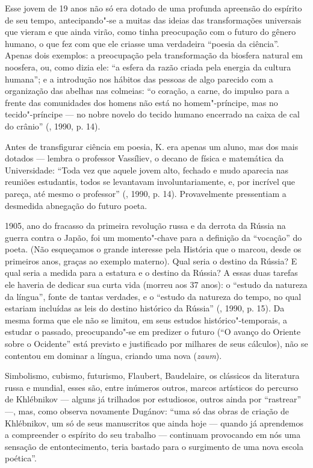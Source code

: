 Esse jovem de 19 anos não só era dotado de uma profunda apreensão do
espírito de seu tempo, antecipando"-se a muitas das ideias das
transformações universais que vieram e que ainda virão, como tinha
preocupação com o futuro do gênero humano, o que fez com que ele criasse
uma verdadeira ``poesia da ciência''. Apenas dois exemplos: a
preocupação pela transformação da biosfera natural em noosfera, ou, como
dizia ele: ``a esfera da razão criada pela energia da cultura humana'';
e a introdução nos hábitos das pessoas de algo parecido com a
organização das abelhas nas colmeias: ``o coração, a carne, do impulso
para a frente das comunidades dos homens não está no homem"-príncipe, mas
no tecido"-príncipe --- no nobre novelo do tecido humano encerrado na
caixa de cal do crânio'' (, 1990, p. 14).

Antes de transfigurar ciência em poesia, K.
era apenas um aluno, mas dos mais dotados --- lembra o professor Vassíliev, o
decano de física e matemática da Universidade: ``Toda vez que aquele
jovem alto, fechado e mudo aparecia nas reuniões estudantis, todos se
levantavam involuntariamente, e, por incrível que pareça, até mesmo o
professor'' (, 1990, p. 14). Provavelmente pressentiam a desmedida abnegação do futuro
poeta.

1905, ano do fracasso da primeira revolução
russa e da derrota da Rússia na guerra contra o Japão, foi um momento"-chave
para a definição da ``vocação'' do poeta. (Não esqueçamos o
grande interesse pela História que o marcou, desde os primeiros
anos, graças ao exemplo materno). Qual seria o destino da Rússia? E qual
seria a medida para a estatura e o destino da Rússia? A essas duas
tarefas ele haveria de dedicar sua curta vida (morreu aos
37 anos): o ``estudo da natureza da língua'', fonte de tantas verdades, e o
``estudo da natureza do tempo, no qual estariam incluídas as leis do
destino histórico da Rússia'' (, 1990, p. 15). Da mesma forma que ele não se limitou, em
seus estudos histórico"-temporais, a estudar o passado, preocupando"-se
em predizer o futuro (``O avanço do Oriente sobre o Ocidente'' está
previsto e justificado por milhares de seus cálculos), não se contentou em dominar a língua,
criando uma nova (\emph{zaum}).

Simbolismo, cubismo, futurismo, Flaubert, Baudelaire, os clássicos da
literatura russa e mundial, esses são, entre inúmeros outros, marcos
artísticos do percurso de Khlébnikov --- alguns já trilhados por estudiosos,
outros ainda por ``rastrear'' ---, mas, como observa novamente Dugánov: ``uma só das
obras de criação de Khlébnikov, um só de seus manuscritos que ainda hoje
--- quando já aprendemos a compreender o espírito do seu trabalho ---
continuam provocando em nós uma sensação de entontecimento, teria
bastado para o surgimento de uma nova escola poética''.

